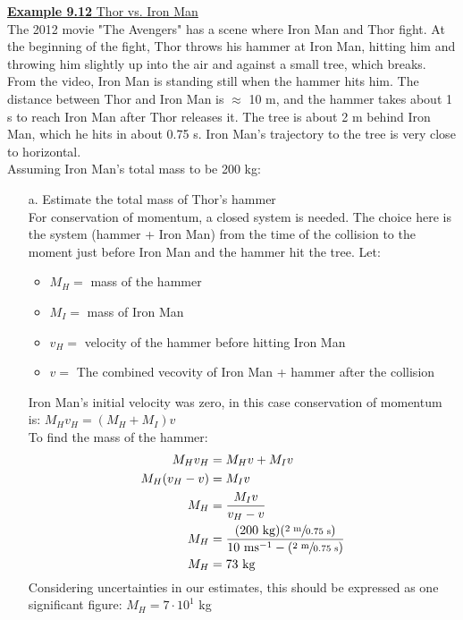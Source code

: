 \documentclass[a4paper]{article}
\let\bf\textbf
\begin{document}
\newpage
\begin{shaded}
    \underline{\bf{Example 9.12} Thor vs. Iron Man}
    \vspace{2mm}\\
    The 2012 movie "The Avengers" has a scene where Iron Man and Thor fight. At the beginning of the fight, Thor throws his hammer at Iron Man, hitting him and throwing him slightly up into the air and against a small tree, which breaks. From the video, Iron Man is standing still when the hammer hits him. The distance between Thor and Iron Man is $\approx$ 10 m, and the hammer takes about 1 s to reach Iron Man after Thor releases it. The tree is about 2 m behind Iron Man, which he hits in about 0.75 s. Iron Man's trajectory to the tree is very close to horizontal.\\
    Assuming Iron Man's total mass to be 200 kg:
    \begin{itemize}
        \item[a.] Estimate the total mass of Thor's hammer\\
        For conservation of momentum, a closed system is needed. The choice here is the system (hammer + Iron Man) from the time of the collision to the moment just before Iron Man and the hammer hit the tree. Let:
        \begin{itemize}
            \item $M_H =$ mass of the hammer
            \item $M_I =$ mass of Iron Man
            \item $v_H =$ velocity of the hammer before hitting Iron Man
            \item $v =$ The combined vecovity of Iron Man + hammer after the collision
        \end{itemize}
        Iron Man's initial velocity was zero, in this case conservation of momentum is: $M_H v_H = (M_H + M_I)v$\\
        To find the mass of the hammer:
        \begin{align*}
            M_H v_H &= M_H v + M_I v\\
            M_H (v_H - v) &= M_I v\\
            M_H &= \frac{M_I v}{v_H - v}\\
            M_H &= \frac{(200\text{ kg})(\sfrac{2\text{ m}}{0.75\text{ s}})}{10\text{ ms}^{-1} - (\sfrac{2\text{ m}}{0.75\text{ s}})}\\
            M_H &= 73\text{ kg} 
        \end{align*}
        Considering uncertainties in our estimates, this should be expressed as one significant figure: $M_H = 7 \cdot 10^1$ kg

\end{itemize}
\end{shaded}
\end{document}
